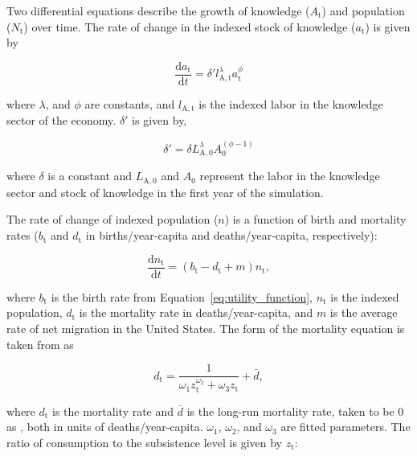 \documentclass[letterpaper,12pt]{article}
\begin{document}
Two differential equations describe the growth of knowledge ($A_\mathrm{t}$) and population ($N_\mathrm{t}$) over time. The rate of change in the indexed stock of knowledge ($a_\mathrm{t}$) is given by

\begin{equation} \label{eq:da_dt}
	\frac{\mathrm{d}a_\mathrm{t}}{\mathrm{d}t} = \delta' l_\mathrm{A,t}^\lambda a_\mathrm{t}^\phi
\end{equation}

\noindent where $\lambda$, and $\phi$ are constants, and $l_\mathrm{A,t}$ is the indexed labor in the knowledge sector of the economy. $\delta'$ is given by,

\begin{equation} \label{eq:delta}
	\delta' = \delta L_\mathrm{A,0}^\lambda A_\mathrm{0}^{(\phi - 1)}
\end{equation}

\noindent where $\delta$ is a constant and $L_\mathrm{A,0}$ and $A_\mathrm{0}$ represent the labor in the knowledge sector and stock of knowledge in the first year of the simulation. 

The rate of change of indexed population ($n$) is a function of birth and mortality rates ($b_\mathrm{t}$ and $d_\mathrm{t}$ in births/year-capita and deaths/year-capita, respectively):

\begin{equation} \label{eq:dn_dt}
	\frac{\mathrm{d}n_\mathrm{t}}{\mathrm{d}t} = (b_\mathrm{t} - d_\mathrm{t} + m) n_\mathrm{t},
\end{equation}

\noindent where $b_\mathrm{t}$ is the birth rate from Equation~\ref{eq:utility_function}, $n_\mathrm{t}$ is the indexed population, $d_\mathrm{t}$ is the mortality rate in deaths/year-capita, and $m$ is the average rate of net migration in the United States. The form of the mortality equation is taken from \citet{Jones:2001wn} as

\begin{equation} \label{eq:mortality_rate}
	d_\mathrm{t} = \frac{1}{\omega_\mathrm{1} z_\mathrm{t}^{\omega_\mathrm{2}} + \omega_\mathrm{3} z_\mathrm{t}} + \bar d,
\end{equation}

\noindent where $d_\mathrm{t}$ is the mortality rate and $\bar d$ is the long-run mortality rate, taken to be 0 as \citet{Jones:2001wn}, both in units of deaths/year-capita. $\omega_\mathrm{1}$, $\omega_\mathrm{2}$, and $\omega_\mathrm{3}$ are fitted parameters. The ratio of consumption to the subsistence level is given by $z_\mathrm{t}$:
\end{document}
